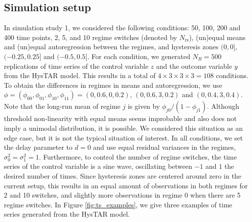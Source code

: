 \documentclass{article}
\begin{document}
\subsection{Simulation setup}
In simulation study 1, we considered the following conditions: 50, 100, 200 and 400 time points, 2, 5, and 10 regime switches (denoted by $N_{\mathrm{rs}}$), (un)equal means and (un)equal autoregression between the regimes, and hysteresis zones $(0, 0]$, $(-0.25, 0.25]$ and $(-0.5, 0.5]$. For each condition, we generated $N_R=500$ replications of time series of the control variable $z$ and the outcome variable $y$ from the HysTAR model.
This results in a total of $4 \times 3 \times 3 \times 3 = 108$ conditions.
To obtain the differences in regimes in means and autoregression, we use $\phi = (\phi_{00}, \phi_{01}, \phi_{10}, \phi_{11}) = (0, 0.6, 0, 0.2)$, $(0, 0.6, 3, 0.2)$ and $(0, 0.4, 3, 0.4)$. Note that the long-run mean of regime $j$ is given by $\phi_{j0}/(1 - \phi_{j1})$. Although threshold non-linearity with equal means seems improbable and also does not imply a unimodal distribution, it is possible. We considered this situation as an edge case, but it is not the typical situation of interest.
In all conditions, we set the delay parameter to $d = 0$ and use equal residual variances in the regimes, $\sigma_0^2 = \sigma_1^2 = 1$. 
Furthermore, to control the number of regime switches, the time series of the control variable is a sine wave, oscillating between $-1$ and $1$ the desired number of times.
Since hysteresis zones are centered around zero in the current setup, this results in an equal amount of observations in both regimes for 2 and 10 switches, and slightly more observations in regime 0 when there are 5 regime switches.
In Figure \ref{fig:ts_examples}, we give three examples of time series generated from the HysTAR model.
\end{document}

